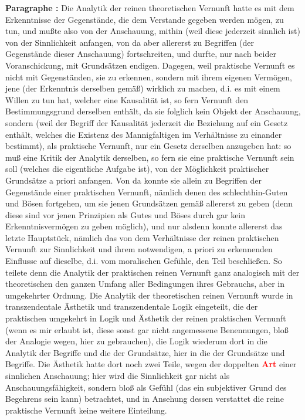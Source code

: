 \documentclass[a4paper,12pt,twoside]{book}
\newcommand{\match}[1]{\textcolor{red}{\textbf{#1}}}
\begin{document}
	\noindent\textbf{Paragraphe : }Die Analytik der reinen theoretischen Vernunft hatte es mit dem Erkenntnisse der Gegenstände, die dem Verstande gegeben werden mögen, zu tun, und mußte also von der Anschauung, mithin (weil diese jederzeit sinnlich ist) von der Sinnlichkeit anfangen, von da aber allererst zu Begriffen (der Gegenstände dieser Anschauung) fortschreiten, und durfte, nur nach beider Voranschickung, mit Grundsätzen endigen. Dagegen, weil praktische Vernunft es nicht mit Gegenständen, sie zu erkennen, sondern mit ihrem eigenen Vermögen, jene (der Erkenntnis derselben gemäß) wirklich zu machen, d.i. es mit einem Willen zu tun hat, welcher eine Kausalität ist, so fern Vernunft den Bestimmungsgrund derselben enthält, da sie folglich kein Objekt der Anschauung, sondern (weil der Begriff der Kausalität jederzeit die Beziehung auf ein Gesetz enthält, welches die Existenz des Mannigfaltigen im Verhältnisse zu einander bestimmt), als praktische Vernunft, nur ein Gesetz derselben anzugeben hat: so muß eine Kritik der Analytik derselben, so fern sie eine praktische Vernunft sein soll (welches die eigentliche Aufgabe ist), von der Möglichkeit praktischer Grundsätze a priori anfangen. Von da konnte sie allein zu Begriffen der Gegenstände einer praktischen Vernunft, nämlich denen des schlechthin-Guten und Bösen fortgehen, um sie jenen Grundsätzen gemäß allererst zu geben (denn diese sind vor jenen Prinzipien als Gutes und Böses durch gar kein Erkenntnisvermögen zu geben möglich), und nur alsdenn konnte allererst das letzte Hauptstück, nämlich das von dem Verhältnisse der reinen praktischen Vernunft zur Sinnlichkeit und ihrem notwendigen, a priori zu erkennenden Einflusse auf dieselbe, d.i. vom moralischen Gefühle, den Teil beschließen. So teilete  denn die Analytik der praktischen reinen Vernunft ganz analogisch mit der theoretischen den ganzen Umfang aller Bedingungen ihres Gebrauchs, aber in umgekehrter Ordnung. Die Analytik der theoretischen reinen Vernunft wurde in transzendentale Ästhetik und transzendentale Logik eingeteilt, die der praktischen umgekehrt in Logik und Ästhetik der reinen praktischen Vernunft (wenn es mir erlaubt ist, diese sonst gar nicht angemessene Benennungen, bloß der Analogie wegen, hier zu gebrauchen), die Logik wiederum dort in die Analytik der Begriffe und die der Grundsätze, hier in die der Grundsätze und Begriffe. Die Ästhetik hatte dort noch zwei Teile, wegen der doppelten \match{Art} einer sinnlichen Anschauung; hier wird die Sinnlichkeit gar nicht als Anschauungsfähigkeit, sondern bloß als Gefühl (das ein subjektiver Grund des Begehrens sein kann) betrachtet, und in Ansehung dessen verstattet die reine praktische Vernunft keine weitere Einteilung. 
	
\end{document}
